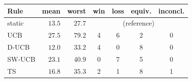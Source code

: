 \begin{tabular}{lrrcccc}
\toprule
Rule & mean & worst & win & loss & equiv. & inconcl.\\
\midrule
static & $13.5$ & $27.7$ & \multicolumn{4}{c}{(reference)}\\
UCB & $27.5$ & $79.2$ & 4 & 6 & 2 & 0\\
D-UCB & $12.0$ & $33.2$ & 4 & 0 & 8 & 0\\
SW-UCB & $23.1$ & $40.9$ & 0 & 7 & 5 & 0\\
TS & $16.8$ & $35.3$ & 2 & 1 & 8 & 1\\
\bottomrule
\end{tabular}
